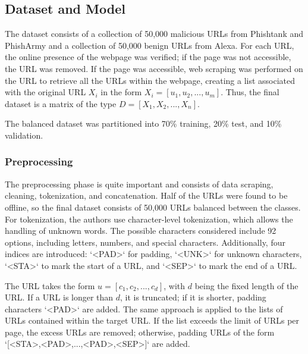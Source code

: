 \subsection{Dataset and Model}
The dataset consists of a collection of 50,000 malicious URLs from Phishtank and PhishArmy and a collection of 50,000 benign URLs from Alexa. For each URL, the online presence of the webpage was verified; if the page was not accessible, the URL was removed. If the page was accessible, web scraping was performed on the URL to retrieve all the URLs within the webpage, creating a list associated with the original URL \(X_i\) in the form \(X_i = [u_1,u_2,...,u_m]\). Thus, the final dataset is a matrix of the type \(D = [X_1,X_2,...,X_n]\).

The balanced dataset was partitioned into 70\% training, 20\% test, and 10\% validation.
\subsubsection{Preprocessing}
The preprocessing phase is quite important and consists of data scraping, cleaning, tokenization, and concatenation. Half of the URLs were found to be offline, so the final dataset consists of 50,000 URLs balanced between the classes. For tokenization, the authors use character-level tokenization, which allows the handling of unknown words. The possible characters considered include 92 options, including letters, numbers, and special characters. Additionally, four indices are introduced: `<PAD>` for padding, `<UNK>` for unknown characters, `<STA>` to mark the start of a URL, and `<SEP>` to mark the end of a URL.

The URL takes the form \(u = [c_1,c_2,...,c_d]\), with \(d\) being the fixed length of the URL. If a URL is longer than \(d\), it is truncated; if it is shorter, padding characters `<PAD>` are added. The same approach is applied to the lists of URLs contained within the target URL. If the list exceeds the limit of URLs per page, the excess URLs are removed; otherwise, padding URLs of the form `[<STA>,<PAD>,...,<PAD>,<SEP>]` are added. 

